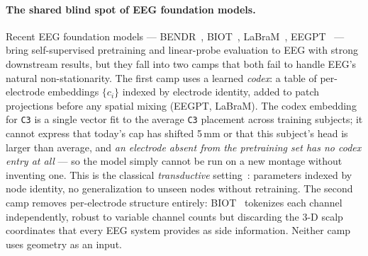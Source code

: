 \documentclass[11pt]{article}
\begin{document}
\paragraph{The shared blind spot of EEG foundation models.}
Recent EEG foundation models --- BENDR~\cite{kostas2021bendr},
BIOT~\cite{yang2023biot}, LaBraM~\cite{jiang2024labram},
EEGPT~\cite{wang2024eegpt} --- bring self-supervised pretraining and
linear-probe evaluation to EEG with strong downstream results, but they fall
into two camps that both fail to handle EEG's natural non-stationarity. The
first camp uses a learned \emph{codex}: a table of per-electrode embeddings
$\{c_i\}$ indexed by electrode identity, added to patch projections before
any spatial mixing (EEGPT, LaBraM). The codex embedding for \texttt{C3} is
a single vector fit to the average \texttt{C3} placement across training
subjects; it cannot express that today's cap has shifted 5\,mm or that this
subject's head is larger than average, and \emph{an electrode absent from the
pretraining set has no codex entry at all} --- so the model simply cannot be
run on a new montage without inventing one. This is the classical
\emph{transductive} setting~\cite{hamilton2017graphsage}: parameters indexed
by node identity, no generalization to unseen nodes without retraining. The
second camp removes per-electrode structure entirely:
BIOT~\cite{yang2023biot} tokenizes each channel independently, robust to
variable channel counts but discarding the 3-D scalp coordinates that every
EEG system provides as side information. Neither camp uses geometry as an
input.
\end{document}

